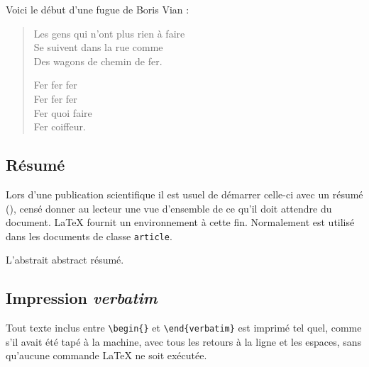 \begin{example}
Voici le début d'une
fugue de Boris Vian :
\begin{flushleft}
\begin{verse}
Les gens qui n'ont plus
  rien à faire\\
Se suivent dans la rue comme\\
Des wagons de chemin de fer.

Fer fer fer\\
Fer fer fer\\
Fer quoi faire\\
Fer coiffeur.\\
\end{verse}
\end{flushleft}
\end{example}

\subsection{Résumé}

Lors d'une publication scientifique il est usuel de démarrer celle-ci
avec un résumé (), censé donner au lecteur une vue
d'ensemble de ce qu'il doit attendre du document. \LaTeX{} fournit un
environnement  à cette fin. Normalement  est
utilisé dans les documents de classe \texttt{article}.

\newenvironment{abstract}%
        {\begin{center}\begin{small}\begin{minipage}{0.8\textwidth}}%
        {\end{minipage}\end{small}\end{center}}
\begin{example}
\begin{abstract}
L'abstrait abstract résumé.
\end{abstract}
\end{example}

\subsection{Impression \emph{verbatim}}

Tout texte inclus entre \verb|\begin{|\verb|}| et
\verb|\end{verbatim}| est imprimé tel quel, comme s'il avait été tapé
à la machine, avec tous les retours à la ligne et les espaces, sans
qu'aucune commande \LaTeX{} ne soit exécutée.

